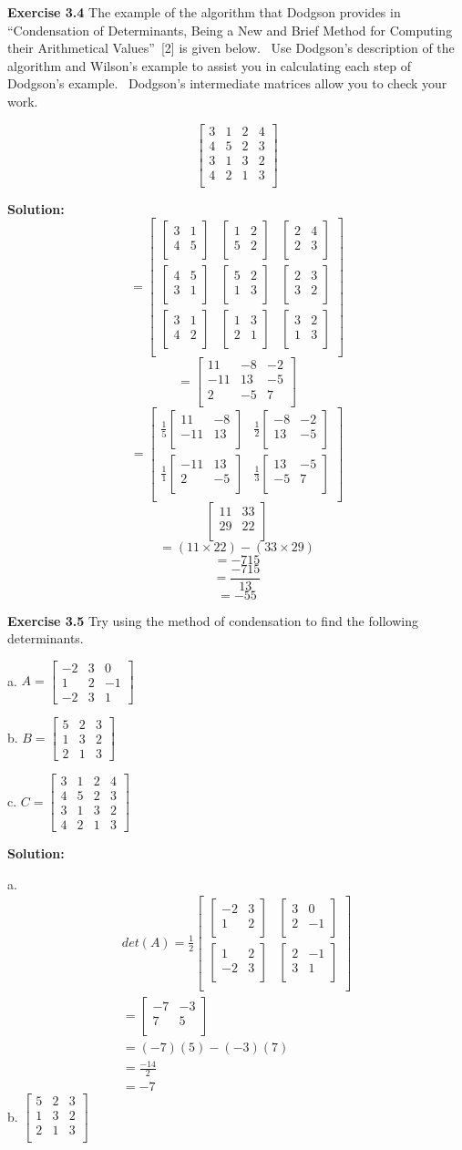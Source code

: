 \documentclass[12pt]{article}
\newcommand{\sol} {\textbf{Solution:}}
\newcommand{\matxx}[2] {
\begin{bmatrix}
  #1 \\
  #2 \\
\end{bmatrix}
}
\newcommand{\matxxx}[3] {
\begin{bmatrix}
  #1 \\
  #2 \\
  #3 \\
\end{bmatrix}
}
\newcommand{\matxxxx}[4] {
\begin{bmatrix}
  #1 \\
  #2 \\
  #3 \\
  #4 \\
\end{bmatrix}
}
\begin{document}
\bigskip

\noindent\textbf{Exercise 3.4} The example of the algorithm that Dodgson
provides in \textquotedblleft Condensation of Determinants, Being a New and
Brief Method for Computing their Arithmetical Values\textquotedblright\ [2] is
given below. \ Use Dodgson's description of the algorithm and Wilson's example
to assist you in calculating each step of Dodgson's example. \ Dodgson's
intermediate matrices allow you to check your work.%

\[
\matxxxx{3&1&2&4}
		{4&5&2&3}
        {3&1&3&2}
        {4&2&1&3}
\]

\bigskip
\sol
\[
=
\matxxx
	{\matxx{3&1}{4&5} & \matxx{1&2}{5&2} & \matxx{2&4}{2&3}}
    {\matxx{4&5}{3&1} & \matxx{5&2}{1&3} & \matxx{2&3}{3&2}}
    {\matxx{3&1}{4&2} & \matxx{1&3}{2&1} & \matxx{3&2}{1&3}}
\]
\[
=
\matxxx
	{11 & -8 & -2}
    {-11 & 13 & -5}
    {2 & -5 & 7}
\]
\[
=
\matxx
	{\frac{1}{5}\matxx{11&-8}{-11&13} & \frac{1}{2}\matxx{-8&-2}{13&-5}}
    {\frac{1}{1}\matxx{-11&13}{2&-5} & \frac{1}{3}\matxx{13&-5}{-5&7}} \]
\[
\matxx{11 & 33}{29 & 22}
\]
\[
=(11 \times 22) - (33 \times 29)
\]
\[
= - 715
\]
\[=\frac{-715}{13}\]
\[=-55\]

\bigskip

\noindent\textbf{Exercise 3.5} Try using the method of condensation to find
the following determinants.

\bigskip
a. $%
A = \begin{bmatrix}
-2 & 3 & 0\\
1 & 2 & -1\\
-2 & 3 & 1
\end{bmatrix}
$

b. $%
B = \begin{bmatrix}
5 & 2 & 3\\
1 & 3 & 2\\
2 & 1 & 3
\end{bmatrix}
$

c. $%
C = \begin{bmatrix}
3 & 1 & 2 & 4\\
4 & 5 & 2 & 3\\
3 & 1 & 3 & 2\\
4 & 2 & 1 & 3
\end{bmatrix}
$

\bigskip
\sol

\bigskip
a.
\[
\begin{split}
det(A) =
\frac{1}{2}
\matxx
  {
    \matxx{-2 & 3}{1 & 2} &
    \matxx{3 & 0}{2 & -1}
  }
  {
    \matxx{1 & 2}{-2 & 3} &
    \matxx{2 & -1}{3 & 1}
  } \\
  = \matxx{-7 & -3}{7 & 5} \\
  = (-7)(5) - (-3)(7) \\
  = \frac{-14}{2} \\
  = -7
\end{split}
\]
b.
\(
\matxxx{5&2&3}
		{1&3&2}
		{2&1&3}
\)
\end{document}
